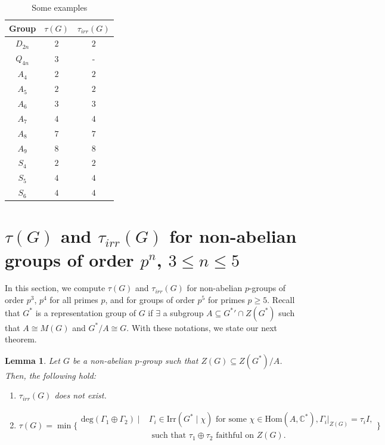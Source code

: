 \documentclass[a4paper,11pt]{amsart}
\numberwithin{equation}{section}
\numberwithin{equation}{subsection}
\newtheorem{lemma}[theorem]{Lemma}
\newcommand{\C}{\mathbb{C}}
\newcommand{\tg}{\tau(G)}
\newcommand{\ti}{\tau_{irr}(G)}
\newcommand{\irr}{\mathrm{Irr}}
\newcommand{\Hom}{\mathrm{Hom}}
\newcommand{\Nayak}[1]{{\color{red} #1}}
\begin{document}
\begin{table}[H]
	\centering
	\small
	\begin{tabular}{|c|c|c|}
		\hline
		Group & $\tau(G)$ & $\tau_{irr}(G)$ \\
		\hline
		$D_{2n}$ & $2$ & $2$ \\
		$Q_{4n}$ & $3$ & - \\
		$A_4$ & $2$ & $2$ \\
		$A_5$ & $2$ & $2$ \\
		$A_6$ & $3$ & $3$ \\
		$A_7$ & $4$ & $4$ \\
		$A_8$ & $7$ & $7$ \\
		$A_9$ & $8$ & $8$ \\
		$S_4$ & $2$ & $2$ \\
		$S_5$ & $4$ & $4$ \\
		$S_6$ & $4$ & $4$ \\
		\hline
	\end{tabular}
	\caption{Some examples} %
	\end{table}
	
	\section{$\tau(G)$ and $\tau_{irr}(G)$ for non-abelian groups of order $p^n$, $3\leq n \leq 5$} \label{groupsoforderp5}
	In this section, we compute $\tau(G)$ and $\tau_{irr}(G)$ for non-abelian $p$-groups of order $p^3$, $p^4$ for all primes $p$, and for groups of order $p^5$ for primes $p\geq 5$. 
	\iffalse
	Recall that $G^*$ is a representation group of $G$ if $\exists$ a subgroup $A \subseteq {G^*}' \cap Z(G^*)$ such that $A \cong M(G)$ and $G^*/A \cong G$. With these notations, we state our next theorem. 
	
	\begin{lemma}
Let $G$ be a non-abelian $p$-group such that $Z
(G) \subseteq Z(G^*)/A$. Then, the following hold:
\begin{enumerate}
	\item $\ti$ does not exist.
	\item $\tg=\operatorname{min}\Biggl\{
	\begin{array}{cl} \mathrm{deg}(\Gamma_1 \oplus \Gamma_2)  \mid & \Gamma_i\in \irr(G^*\mid \chi) \text{ for some } \chi \in \Hom(A,\C^*), \Gamma_i |_{Z(G)}=\tau_i I, \\
		&  \text{ such that } \tau_1 \oplus \tau_2  \text{ faithful on } Z(G).
	\end{array}\Bigg\}$
	
\end{enumerate}

\end{lemma}
\end{document}
